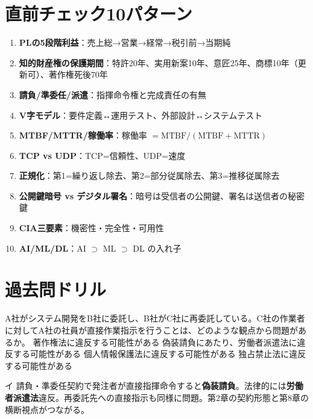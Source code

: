 \section{直前チェック10パターン}

\begin{matome}
\begin{enumerate}
  \item \textbf{PLの5段階利益}：売上総→営業→経常→税引前→当期純
  \item \textbf{知的財産権の保護期間}：特許20年、実用新案10年、意匠25年、商標10年（更新可）、著作権死後70年
  \item \textbf{請負/準委任/派遣}：指揮命令権と完成責任の有無
  \item \textbf{V字モデル}：要件定義↔運用テスト、外部設計↔システムテスト
  \item \textbf{MTBF/MTTR/稼働率}：稼働率 $= \text{MTBF} / (\text{MTBF} + \text{MTTR})$
  \item \textbf{TCP vs UDP}：TCP=信頼性、UDP=速度
  \item \textbf{正規化}：第1=繰り返し除去、第2=部分従属除去、第3=推移従属除去
  \item \textbf{公開鍵暗号 vs デジタル署名}：暗号は受信者の公開鍵、署名は送信者の秘密鍵
  \item \textbf{CIA三要素}：機密性・完全性・可用性
  \item \textbf{AI/ML/DL}：AI $\supset$ ML $\supset$ DL の入れ子
\end{enumerate}
\end{matome}

\section{過去問ドリル}


\begin{itpmon}{%
A社がシステム開発をB社に委託し、B社がC社に再委託している。C社の作業者に対してA社の社員が直接作業指示を行うことは、どのような観点から問題があるか。}
\sentakushi
  {著作権法に違反する可能性がある}
  {偽装請負にあたり、労働者派遣法に違反する可能性がある}
  {個人情報保護法に違反する可能性がある}
  {独占禁止法に違反する可能性がある}
\end{itpmon}
\begin{kaisetsu}{イ}
請負・準委任契約で発注者が直接指揮命令すると\textbf{偽装請負}。法律的には\textbf{労働者派遣法}違反。再委託先への直接指示も同様に問題。第2章の契約形態と第8章の横断視点がつながる。
\end{kaisetsu}


